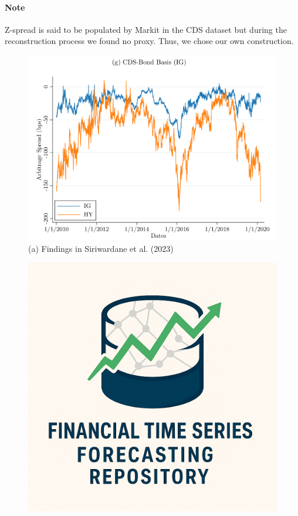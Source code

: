 \documentclass{article}
\begin{document}
\begin{appendices}
\paragraph*{Note}
Z-spread is said to be populated by Markit in the CDS dataset but during the reconstruction process we found no proxy. Thus, we chose our own construction.

\begin{figure}[htbp]
  \centering
  \begin{minipage}[b]{0.48\textwidth}
    \centering
    \includegraphics[width=\linewidth]{../docs_src/SegArb_CDS_Timeseries.png}
    \\[1ex] %
    {\small (a) Findings in Siriwardane et al. (2023)}
  \end{minipage}
  \hfill
  \begin{minipage}[b]{0.48\textwidth}
    \centering
    \includegraphics[width=\linewidth]{../docs_src/logo.png}

\end{minipage}
\end{figure}
\end{appendices}
\end{document}
